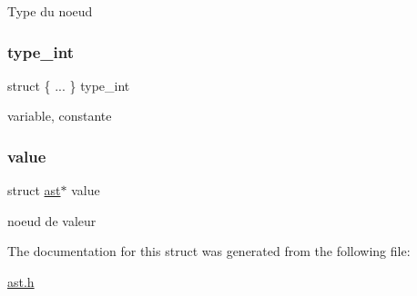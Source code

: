 Type du noeud \mbox{\label{structast_a48c1fea64ccd73c68d3901c23d65f9f5}} 
\subsubsection{\texorpdfstring{type\+\_\+int}{type\_int}}
{\footnotesize\ttfamily struct \{ ... \}   type\+\_\+int}

variable, constante \mbox{\label{structast_a0547e48c9f9ecb35c94f988890f217b7}} 
\subsubsection{\texorpdfstring{value}{value}}
{\footnotesize\ttfamily struct \hyperlink{structast}{ast}$\ast$ value}

noeud de valeur 

The documentation for this struct was generated from the following file\+:\begin{DoxyCompactItemize}
\item 
\hyperlink{ast_8h}{ast.\+h}\end{DoxyCompactItemize}
